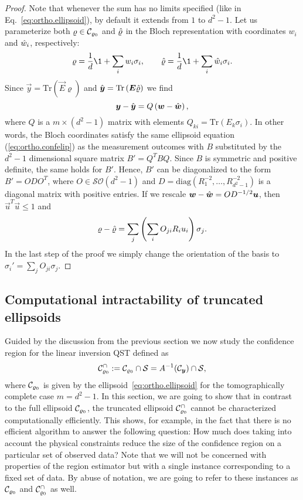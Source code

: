 \begin{proof}
  Note that whenever the sum has no limits specified (like in Eq.~\eqref{eq:ortho.ellipsoid}), by default it extends from $1$ to $d^{2}-1$.
  Let us parameterize both $\varrho \in \mathcal{C}_{\varrho_0}$ and $\hat{\varrho}$ in the Bloch representation with coordinates $w_{i}$ and $\hat{w}_i$, respectively:
  \[
    \varrho=\frac{1}{d}\1 + \sum_{i}w_{i}\sigma_{i},
    \qquad\estim{\varrho}=\frac{1}{d} \1 + \sum_{i}\estim{w}_{i}\sigma_{i}.
  \]
  Since $\vec{y}=\textrm{Tr}\left(\vec{E}\varrho\right)$ and $\hat{{\boldsymbol{y}}}=\textrm{Tr}\left({\boldsymbol{E}}\hat{\varrho}\right)$ we find
  \[
    {\boldsymbol{y}}-\hat{{\boldsymbol{y}}}=Q\left({\boldsymbol{w}}-\hat{{\boldsymbol{w}}}\right),
  \]
  where $Q$ is a $m\times(d^{2}-1)$ matrix with elements $Q_{ki}=\textrm{Tr}\left(E_{k}\sigma_{i}\right)$.
  In other words, the Bloch coordinates satisfy the same ellipsoid equation (\ref{eq:ortho.confelip}) as the measurement outcomes with $B$ substituted by the $d^{2}-1$ dimensional square matrix $B'=Q^{T}BQ$.
  Since $B$ is symmetric and positive definite, the same holds for $B'$.
  Hence, $B'$ can be diagonalized to the form $B'=ODO^{T}$, where $O \in \mathcal{SO}(d^2 - 1)$ and $D=\textrm{diag}(R_{1}^{-2},\ldots,R_{d^{2}-1}^{-2})$ is a diagonal matrix with positive entries.
  If we rescale ${\boldsymbol{w}}-\hat{{\boldsymbol{w}}}=OD^{-1/2}{\boldsymbol{u}}$, then $\vec{u}^{T}\vec{u}\leq1$ and
  \[
    \varrho-\hat{\varrho}=\sum_{j}\left(\sum_{i}O_{ji}R_{i}u_{i}\right)\sigma_{j}.
  \]
  In the last step of the proof we simply change the orientation of the basis to $\sigma_{i}'=\sum_{j}O_{ji}\sigma_{j}$.
\end{proof}


\subsection{Computational intractability of truncated ellipsoids}
\label{sub:ortho.hard}

Guided by the discussion from the previous section we now study the confidence region for the linear inversion QST defined as
\[
  \label{eq:ortho.truncated_ellipsoid}
  \mathcal{C}_{\varrho_0}^\cap := \mathcal{C}_{\varrho_0} \cap \mathcal{S} = A^{-1}(\mathcal{C}_{{\boldsymbol{y}}}) \cap \mathcal{S},
\]
where $\mathcal{C}_{\varrho_0}$ is given by the ellipsoid~\eqref{eq:ortho.ellipsoid} for the tomographically complete case $m=d^2 - 1$.
In this section, we are going to show that in contrast to the full ellipsoid $\mathcal{C}_{\varrho_0}$, the truncated ellipsoid $\mathcal{C}_{\varrho_0}^\cap$ cannot be characterized computationally efficiently.
This shows, for example, in the fact that there is no efficient algorithm to answer the following question:
How much does taking into account the physical constraints reduce the size of the confidence region on a particular set of observed data?
Note that we will not be concerned with properties of the region estimator but with a single instance corresponding to a fixed set of data.
By abuse of notation, we are going to refer to these instances as $\mathcal{C}_{\varrho_0}$ and $\mathcal{C}_{\varrho_0}^\cap$ as well.


